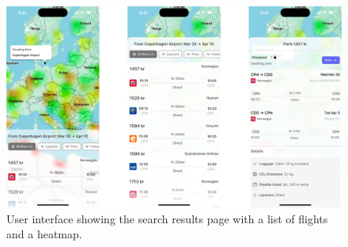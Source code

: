 \begin{figure}[h]
    \includegraphics[width=.89\textwidth]{resources/mockup2.png}
    \caption{User interface showing the search results page with a list of flights and a heatmap.}
    \label{fig:mockup2}
\end{figure}

\newpage
